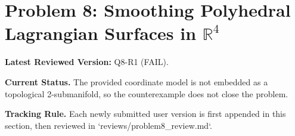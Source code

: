 ﻿\section{Problem 8: Smoothing Polyhedral Lagrangian Surfaces in $\mathbb R^4$}

\textbf{Latest Reviewed Version:} Q8-R1 (FAIL).

\textbf{Current Status.}
The provided coordinate model is not embedded as a topological 2-submanifold, so the counterexample does not close the problem.

\textbf{Tracking Rule.}
Each newly submitted user version is first appended in this section, then reviewed in `reviews/problem8_review.md`.
